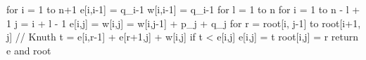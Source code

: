 \startCLRSCODE
{}

for i = 1 to n+1
	e[i,i-1] = q_{i-1}
	w[i,i-1] = q_{i-1}
for l = 1 to n
	for i = 1 to n - l + 1
		j = i + l - 1
		e[i,j] = \infty
		w[i,j] = w[i,j-1] + p_j + q_j
		for r = root[i, j-1] to root[i+1, j]	// Knuth
			t = e[i,r-1] + e[r+1,j] + w[i,j]
			if t < e[i,j]
				e[i,j] = t
				root[i,j] = r
return e and root
\stopCLRSCODE

